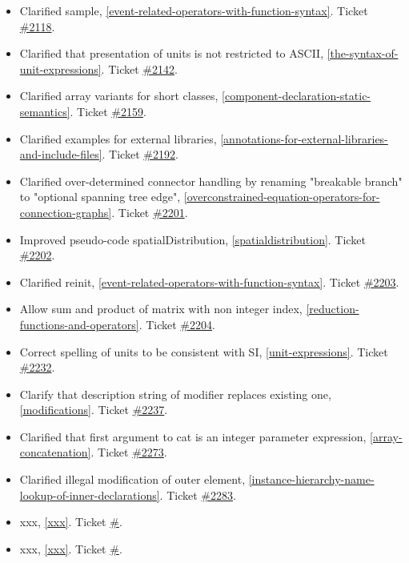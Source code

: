 \begin{itemize}
\item Clarified sample, \cref{event-related-operators-with-function-syntax}.
Ticket \href{https://github.com/modelica/ModelicaSpecification/issues/2118}{\#2118}.
\item Clarified that presentation of units is not restricted to ASCII, \cref{the-syntax-of-unit-expressions}.
Ticket \href{https://github.com/modelica/ModelicaSpecification/issues/2142}{\#2142}.
\item Clarified array variants for short classes, \cref{component-declaration-static-semantics}.
Ticket \href{https://github.com/modelica/ModelicaSpecification/issues/2159}{\#2159}.
\item Clarified examples for external libraries, \cref{annotations-for-external-libraries-and-include-files}.
Ticket \href{https://github.com/modelica/ModelicaSpecification/issues/2192}{\#2192}.
\item Clarified over-determined connector handling by renaming "breakable branch" to "optional spanning tree edge", \cref{overconstrained-equation-operators-for-connection-graphs}.
Ticket \href{https://github.com/modelica/ModelicaSpecification/issues/2201}{\#2201}.
\item Improved pseudo-code spatialDistribution, \cref{spatialdistribution}.
Ticket \href{https://github.com/modelica/ModelicaSpecification/issues/2202}{\#2202}.
\item Clarified reinit, \cref{event-related-operators-with-function-syntax}.
Ticket \href{https://github.com/modelica/ModelicaSpecification/issues/2203}{\#2203}.
\item Allow sum and product of matrix with non integer index, \cref{reduction-functions-and-operators}.
Ticket \href{https://github.com/modelica/ModelicaSpecification/issues/2204}{\#2204}.
\item Correct spelling of units to be consistent with SI, \cref{unit-expressions}.
Ticket \href{https://github.com/modelica/ModelicaSpecification/issues/2232}{\#2232}.
\item Clarify that description string of modifier replaces existing one, \cref{modifications}.
Ticket \href{https://github.com/modelica/ModelicaSpecification/issues/2237}{\#2237}.
\item Clarified that first argument to cat is an integer parameter expression, \cref{array-concatenation}.
Ticket \href{https://github.com/modelica/ModelicaSpecification/issues/2273}{\#2273}.
\item Clarified illegal modification of outer element, \cref{instance-hierarchy-name-lookup-of-inner-declarations}.
Ticket \href{https://github.com/modelica/ModelicaSpecification/issues/2283}{\#2283}.



\item xxx, \cref{xxx}.
Ticket \href{https://github.com/modelica/ModelicaSpecification/issues/}{\#}.
\item xxx, \cref{xxx}.
Ticket \href{https://github.com/modelica/ModelicaSpecification/pull/}{\#}.
\fi
\end{itemize}
